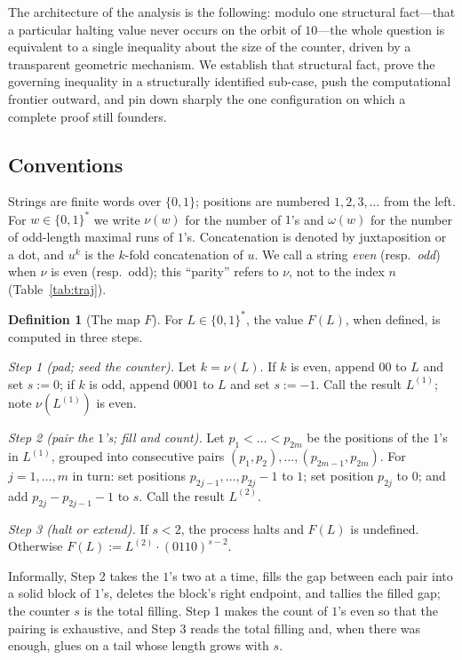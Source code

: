 \documentclass[11pt,reqno]{amsart}
\theoremstyle{plain}
\theoremstyle{definition}
\newtheorem{definition}{Definition}
\theoremstyle{remark}
\begin{document}
The architecture of the analysis is the following: modulo one structural fact---that a particular halting value never occurs on the orbit of $10$---the whole question is equivalent to a single inequality about the size of the counter, driven by a transparent geometric mechanism. We establish that structural fact, prove the governing inequality in a structurally identified sub-case, push the computational frontier outward, and pin down sharply the one configuration on which a complete proof still founders.

\subsection*{Conventions} Strings are finite words over $\{0,1\}$; positions are numbered $1,2,3,\dots$ from the left. For $w\in\{0,1\}^*$ we write $\nu(w)$ for the number of $1$'s and $\omega(w)$ for the number of odd-length maximal runs of $1$'s. Concatenation is denoted by juxtaposition or a dot, and $u^k$ is the $k$-fold concatenation of $u$. We call a string \emph{even} (resp.\ \emph{odd}) when $\nu$ is even (resp.\ odd); this ``parity'' refers to $\nu$, not to the index $n$ (Table~\ref{tab:traj}).

\begin{definition}[The map $F$]\label{def:F}
For $L\in\{0,1\}^*$, the value $F(L)$, when defined, is computed in three steps.

\emph{Step 1 (pad; seed the counter).} Let $k=\nu(L)$. If $k$ is even, append $00$ to $L$ and set $s:=0$; if $k$ is odd, append $0001$ to $L$ and set $s:=-1$. Call the result $L^{(1)}$; note $\nu(L^{(1)})$ is even.

\emph{Step 2 (pair the $1$'s; fill and count).} Let $p_1<\dots<p_{2m}$ be the positions of the $1$'s in $L^{(1)}$, grouped into consecutive pairs $(p_1,p_2),\dots,(p_{2m-1},p_{2m})$. For $j=1,\dots,m$ in turn: set positions $p_{2j-1},\dots,p_{2j}-1$ to $1$; set position $p_{2j}$ to $0$; and add $p_{2j}-p_{2j-1}-1$ to $s$. Call the result $L^{(2)}$.

\emph{Step 3 (halt or extend).} If $s<2$, the process halts and $F(L)$ is undefined. Otherwise $F(L):=L^{(2)}\cdot(0110)^{s-2}$.
\end{definition}

Informally, Step 2 takes the $1$'s two at a time, fills the gap between each pair into a solid block of $1$'s, deletes the block's right endpoint, and tallies the filled gap; the counter $s$ is the total filling. Step 1 makes the count of $1$'s even so that the pairing is exhaustive, and Step 3 reads the total filling and, when there was enough, glues on a tail whose length grows with $s$.
\end{document}
